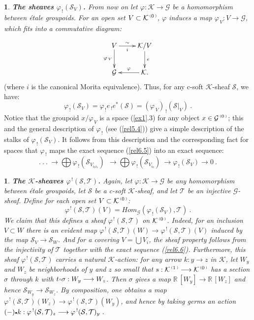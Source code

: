 \documentclass[a4paper]{article}
\newtheorem{num}[st]{}
\newcommand{\ii}{\ensuremath{\mathcal{T}}}
\newcommand{\f}{\ensuremath{\varphi}}
\newcommand{\rmap}{\longrightarrow}
\newcommand{\Ka}{\ensuremath{\mathcal{K}}}
\newcommand{\G}{\ensuremath{\mathcal{G}}}
\newcommand{\es}{\ensuremath{\mathcal{S}}}
\newcommand{\ps}{{\raise 1pt\hbox{\tiny (}}}
\newcommand{\pd}{{\raise 1pt\hbox{\tiny )}}}
\newcommand{\nG}[1]{\ensuremath{\G^{\,\ps #1\,\pd}}}
\newcommand{\nK}[1]{\ensuremath{\Ka^{\,\ps #1\,\pd}}}
\def\cdot{{\raise 0.5pt\hbox{$\scriptscriptstyle\bullet$}}}
\def\compose{{\raise 1pt\hbox{$\scriptscriptstyle\circ$}}}
\begin{document}
\begin{num}
\emph{
{\bf The sheaves $\f_{\, !}(\es_{V})$.} From now on let $\f :\Ka \rmap \G$ be a homomorphism between \'etale groupoids. For an open set $V \subset \nK{0}$, $\f$ induces a map $\f_{\, V}: V\rmap \G$, which fits into a commutative diagram:
}
\end{num}
\[ \xymatrix{
V \ar[d]_-{\f_{\, V}} \ar[r]^-{\sim}_-{i} & \Ka/V \ar[d]^-{e}\\
\G & \Ka \ar[l]_-{\f} . } \]
(where $i$ is the canonical Morita equivalence). Thus, for any c-soft $\Ka$-sheaf $\es$, we have:
\begin{equation}
\label{half}
 \f_{\, !}(\es_{V}) = \f_{\, !} e_{\, !} e^{*}(\es) = (\f_{\, V})_{\, !}(\es|_{V})\ .
\end{equation}
\hspace*{.3in} Notice that the groupoid $x/\f_{\, V}$ is a space (\ref{ex1}.3) for any object $x\in \nG{0}$; this and the general description of $\f_{\, !}$ (see (\ref{rel5.4})) give a simple description of the stalks of $\f_{\, !}(\es_{V})$. It follows from this description and the corresponding fact for spaces that $\f_{\, !}$ maps the exact sequence (\ref{rel6.5}) into an exact sequence:
\begin{equation}
\label{rel6.6}
.\ .\ .\ \rmap \bigoplus \f_{\, !}(\es_{V_{i_{0}i_{1}}})\ \  \rmap \bigoplus \f_{\, !}(\es_{V_{i_{0}}})\           \rmap \f_{\, !}(\es_{V}) \rmap 0\ .
\end{equation} 








\begin{num}
\emph{
{\bf The $\Ka$-sheaves $\f^{\, !}(\es, \ii)$.}  Again, let $\f : \Ka \rmap \G$ be any homomorphism between \'etale groupoids, let $\es$ be a c-soft $\Ka$-sheaf, and let $\ii$ be an injective $\G$-sheaf. Define for each open set $V \subset \nK{0}$:
\[ \f^{\, !}(\es, \ii)(V) = Hom_{\G}(\f_{\, !}(\es_{V}), \ii)\ .\]
\hspace*{.3in} We claim that this defines a sheaf $\f^{\, !}(\es, \ii)$ on $\nK{0}$. Indeed, for an inclusion $V\subset W$ there is an evident map $\f^{\, !}(\es, \ii)(W) \rmap \f^{\, !}(\es, \ii)(V)$ induced by the map $\es_{V} \rmap \es_{W}$. And for a covering $V= \bigcup V_{i}$, the sheaf property follows from the injectivity of $\ii$ together with the exact sequence (\ref{rel6.6}). Furthermore, this sheaf $\f^{\, !}(\es, \ii)$ carries a natural $\Ka$-action: for any arrow $k: y\rmap z$ in $\Ka$, let $W_{y}$ and $W_{z}$ be neighborhoods of $y$ and $z$ so small that $s: \nK{1} \rmap \nK{0}$ has a section $\sigma$ through $k$ with $t\compose \sigma : W_{y}\rmap W_{z}$. Then $\sigma$ gives a map $\mathbb{R}\, [W_{y}] \rmap \mathbb{R}\, [W_{z}]$  and hence $\es_{W_{y}} \rmap \es_{W_{z}}$. By composition, one obtains a map $\f^{\, !}(\es, \ii)(W_{z}) \rmap \f^{\, !}(\es, \ii)(W_{y})$, and hence by taking germs an action
$(-)\cdot k : \f^{\, !}(\es, \ii)_{z} \rmap \f^{\, !}(\es, \ii)_{y}\ .$
}
\end{num}
\end{document}
